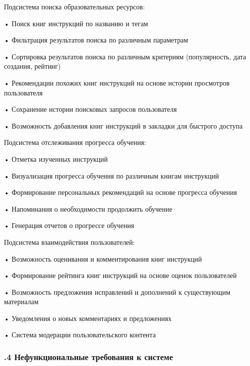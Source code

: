 {  \par \redline Подсистема поиска образовательных ресурсов:

  \par \redline • Поиск книг инструкций по названию и тегам
  \par \redline • Фильтрация результатов поиска по различным параметрам
  \par \redline • Сортировка результатов поиска по различным критериям (популярность, дата создания, рейтинг)
  \par \redline • Рекомендации похожих книг инструкций на основе истории просмотров пользователя
  \par \redline • Сохранение истории поисковых запросов пользователя
  \par \redline • Возможность добавления книг инструкций в закладки для быстрого доступа

  \par \redline Подсистема отслеживания прогресса обучения:

  \par \redline • Отметка изученных инструкций
  \par \redline • Визуализация прогресса обучения по различным книгам инструкций
  \par \redline • Формирование персональных рекомендаций на основе прогресса обучения
  \par \redline • Напоминания о необходимости продолжить обучение
  \par \redline • Генерация отчетов о прогрессе обучения

  \par \redline Подсистема взаимодействия пользователей:

  \par \redline • Возможность оценивания и комментирования книг инструкций
  \par \redline • Формирование рейтинга книг инструкций на основе оценок пользователей
  \par \redline • Возможность предложения исправлений и дополнений к существующим материалам
  \par \redline • Уведомления о новых комментариях и предложениях
  \par \redline • Система модерации пользовательского контента

  \par
}

\subtitlespace

\subsubsection*{ 
  \gostTitleFont
  .4 Нефункциональные требования к системе
} 

